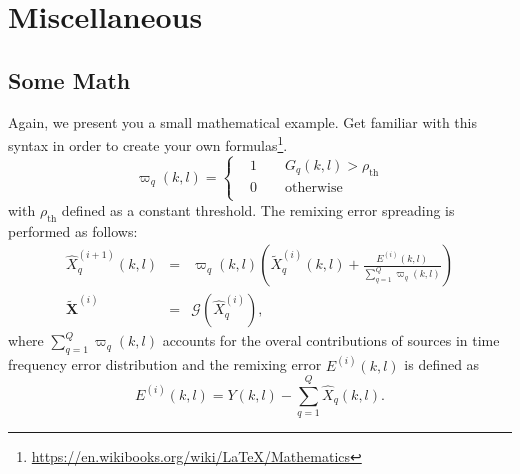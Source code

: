 	\chapter{Miscellaneous}
	\section{Some Math}
	\renewcommand{\thepage}{}
	Again, we present you a small mathematical example. Get familiar with this syntax in order to create your own formulas\footnote{\url{https://en.wikibooks.org/wiki/LaTeX/Mathematics}}.
	\begin{equation}
	\varpi_q(k,l)=\begin{cases}
	&1\quad \quad G_q(k,l)>\rho_{\text{th}}\\
	&0\quad \quad \text{otherwise}\\
	\end{cases}
	\end{equation}
	with $\rho_{\text{th}}$ defined as a constant threshold. The remixing error spreading is performed as follows:
	\begin{eqnarray}
	\hat{X}^{(i+1)}_q(k,l)&=&{\varpi}_q(k,l)\left(\tilde{{X}}^{(i)}_q(k,l)+\frac{E^{(i)}(k,l)}{\sum_{q=1}^Q{{\varpi}_q(k,l)}}\right)\nonumber\\
	\tilde{\mathbf{X}}^{(i)}&=&\mathcal{G}(\hat{X}_q^{(i)}),
	\end{eqnarray}
	where $\sum_{q=1}^Q{{\varpi}_q(k,l)}$ accounts for the overal contributions of sources in time frequency error distribution and the remixing error $E^{(i)}(k,l)$ is defined as 
	\begin{equation}
	E^{(i)}(k,l)=Y(k,l)-\sum_{q=1}^{Q}{\hat{X}_q(k,l)}.
	\end{equation}
	
